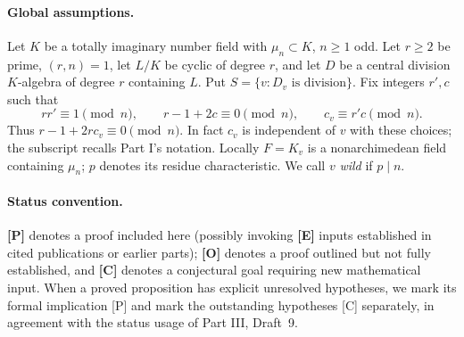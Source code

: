 \documentclass[11pt]{article}
\theoremstyle{plain}
\theoremstyle{definition}
\begin{document}
\paragraph{Global assumptions.}
Let $K$ be a totally imaginary number field with $\mu_n\subset K$,
$n\geq1$ odd.  Let $r\geq2$ be prime, $(r,n)=1$, let $L/K$ be cyclic
of degree $r$, and let $D$ be a central division $K$-algebra of
degree $r$ containing $L$.  Put $S=\{v:D_v\text{ is division}\}$.
Fix integers $r',c$ such that
\begin{equation}\label{eq:parameters}
 rr'\equiv1\pmod n,\qquad r-1+2c\equiv0\pmod n,
 \qquad c_v\equiv r'c\pmod n.
\end{equation}
Thus $r-1+2rc_v\equiv0\pmod n$.  In fact $c_v$ is independent
of $v$ with these choices; the subscript recalls Part I's notation.
Locally $F=K_v$ is a nonarchimedean field containing $\mu_n$;
$p$ denotes its residue characteristic.  We call $v$ \emph{wild}
if $p\mid n$.

\paragraph{Status convention.}
\textbf{[P]} denotes a proof included here (possibly invoking
\textbf{[E]} inputs established in cited publications or earlier parts);
\textbf{[O]} denotes a proof outlined but not fully established, and
\textbf{[C]} denotes a conjectural goal requiring new mathematical
input.  When a proved proposition has explicit unresolved hypotheses,
we mark its formal implication [P] and mark the outstanding hypotheses
[C] separately, in agreement with the status usage of Part III,
Draft~9.
\end{document}
